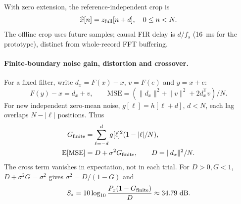 With zero extension, the reference-independent crop is
\begin{equation}
 \widehat x[n]=z_{\rm full}[n+d],\quad 0\le n<N.
 \label{eq:r21-centred-crop}
\end{equation}
The offline crop uses future samples; causal FIR delay is $d/f_s$
(16~ms for the prototype), distinct from whole-record FFT buffering.

\paragraph{Finite-boundary noise gain, distortion and crossover.}
For a fixed filter, write $d_x=F(x)-x$, $v=F(e)$ and $y=x+e$:
\begin{equation}
 F(y)-x=d_x+v,\qquad
 \mathrm{MSE}=(\|d_x\|^2+\|v\|^2+2d_x^{\mathsf T}v)/N.
 \label{eq:r22-distortion-decomposition}
\end{equation}
For new independent zero-mean noise, $g[\ell]=h[\ell+d]$, $d<N$,
each lag overlaps $N-|\ell|$ positions. Thus
\begin{align}
 G_{\rm finite}&=\sum_{\ell=-d}^dg[\ell]^2(1-|\ell|/N),\nonumber\\
 \mathbb E[\mathrm{MSE}]&=D+\sigma^2G_{\rm finite},\qquad D=\|d_x\|^2/N.
 \label{eq:r22-finite-noise-gain}
\end{align}
The cross term vanishes in expectation, not in each trial. For $D>0,G<1$,
$D+\sigma^2G=\sigma^2$ gives $\sigma^2=D/(1-G)$ and
\begin{equation}
 S_* =10\log_{10}\frac{P_x(1-G_{\rm finite})}{D}
       \approx34.79\ {\rm dB}.
 \label{eq:r22-crossover}
\end{equation}

